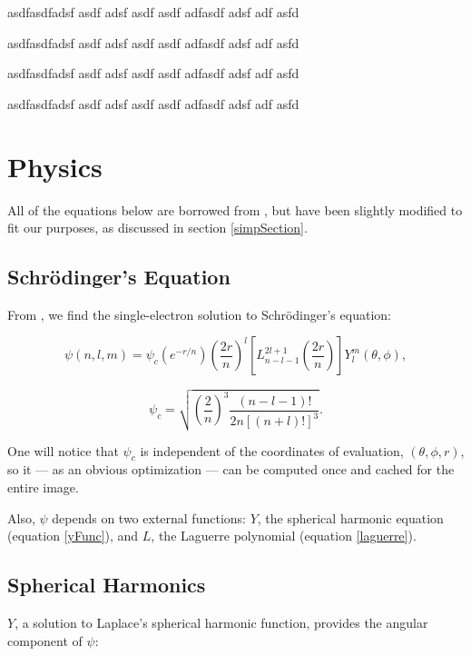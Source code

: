\documentclass{acmsiggraph}
\begin{document}
asdfasdfadsf asdf adsf asdf asdf adfasdf adsf adf asfd

asdfasdfadsf asdf adsf asdf asdf adfasdf adsf adf asfd

asdfasdfadsf asdf adsf asdf asdf adfasdf adsf adf asfd

asdfasdfadsf asdf adsf asdf asdf adfasdf adsf adf asfd

\section{Physics}

All of the equations below are borrowed from \cite{quantumBook}, but have been slightly modified to fit our purposes, as discussed in section \ref{simpSection}.

\subsection{Schr\"{o}dinger's Equation}

From \cite{quantumBook}, we find the single-electron solution to Schr\"{o}dinger's equation:

\begin{equation}\label{psi}
\psi\left(n, l, m\right)=\psi_c
\left(\mathit{e}^{-r/n}\right)
\left(\frac{2r}{n}\right)^l
\left[L_{n-l-1}^{2l+1}
    \left(\frac{2r}{n}\right)\right]
Y_l^m\left(\theta,\phi\right),
\end{equation}

\begin{equation}\label{psiConstant}
\psi_c=\sqrt{\left(\frac{2}{n}\right)^3
    \frac{\left(n-l-1\right)!}{2n\left[\left(n+l\right)!\right]^3}}.
\end{equation}

One will notice that $\psi_c$ is independent of the coordinates of evaluation, $\left(\theta, \phi, r\right)$, so it --- as an obvious optimization --- can be computed once and cached for the entire image.

Also, $\psi$ depends on two external functions: $Y$, the spherical harmonic equation (equation \ref{yFunc}), and $L$, the Laguerre polynomial (equation \ref{laguerre}).

\subsection{Spherical Harmonics}

\label{sphericalHarmonics}

$Y$, a solution to Laplace's spherical harmonic function, provides the angular component of $\psi$:
\end{document}
